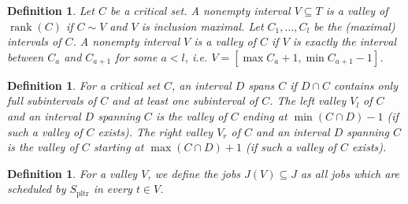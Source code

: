 \documentclass[a4paper]{article}
\DeclareMathOperator{\PLTR}{pltr}
\DeclareMathOperator{\rank}{rank}
\newtheorem{definition}[theorem]{Definition}
\begin{document}
\begin{definition}
  Let $C$ be a critical set. A nonempty interval $V \subseteq T$ is a \emph{valley of $\rank(C)$} if $C \sim V$ and $V$ is inclusion maximal.
  Let $C_1, \ldots, C_l$ be the (maximal) intervals of $C$.
  A nonempty interval $V$ is a \emph{valley of $C$} if $V$ is exactly the interval between $C_{a}$ and $C_{a+1}$ for some $a < l$, i.e. $V = [\max C_a + 1, \min C_{a+1} - 1]$.
\end{definition}
\begin{definition}
  For a critical set $C$, an interval $D$ \emph{spans} $C$ if $D \cap C$ contains only full subintervals of $C$ and at least one subinterval of $C$.
  The \emph{left valley} $V_l$ of $C$ and an interval $D$ spanning $C$ is the valley of $C$ ending at $\min (C \cap D) - 1$ (if such a valley of $C$ exists).
  The \emph{right valley} $V_r$ of $C$ and an interval $D$ spanning $C$ is the valley of $C$ starting at $\max (C \cap D) + 1$ (if such a valley of $C$ exists).
\end{definition}

\begin{definition}
  For a valley $V$, we define the jobs $J(V) \subseteq J$ as all jobs which are scheduled by $S_{\PLTR}$ in every $t \in V$.
\end{definition}
\end{document}
